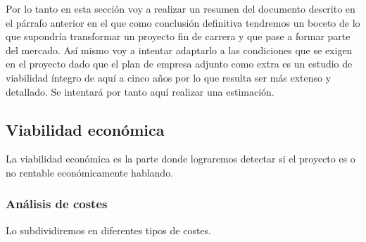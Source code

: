 Por lo tanto en esta sección voy a realizar un resumen del documento descrito en el párrafo anterior en el que como conclusión definitiva tendremos un boceto de lo que supondría transformar un proyecto fin de carrera y que pase a formar parte del mercado. Así mismo voy a intentar adaptarlo a las condiciones que se exigen en el proyecto dado que el plan de empresa adjunto como extra es un estudio de viabilidad íntegro de aquí a cinco años por lo que resulta ser más extenso y detallado. Se intentará por tanto aquí realizar una estimación.

\subsection{Viabilidad económica}\label{viabilidad-economica}

La viabilidad económica es la parte donde lograremos detectar si el proyecto es o no rentable económicamente hablando.

\subsubsection{Análisis de costes}\label{costes}

Lo subdividiremos en diferentes tipos de costes.

